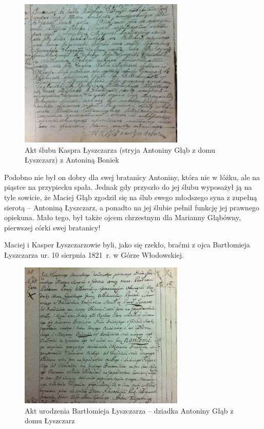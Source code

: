 \begin{figure}[!h]
\begin{center}
\includegraphics[width=0.7\textwidth]{zdjecia/akt_slubu_kaspra_lyszczarza_i_antoniny_boniek.jpg}
\caption{Akt ślubu Kaspra Łyszczarza (stryja Antoniny Głąb z domu Łyszczarz) z Antoniną Boniek}
\label{rys:akt_slubu_kaspra_lyszczarza_i_antoniny_boniek}
\end{center}
\end{figure}

Podobno nie był on dobry dla swej bratanicy Antoniny, która nie w łóżku, ale na piąstce na przypiecku spała. Jednak gdy przyszło do jej ślubu wyposażył ją na tyle sowicie, że Maciej Głąb zgodził się na ślub swego młodszego syna z zupełną sierotą -- Antoniną Łyszczarz, a ponadto na jej ślubie pełnił funkcję jej prawnego opiekuna. Mało tego, był także ojcem chrzestnym dla Marianny Głąbówny, pierwszej córki swej bratanicy!

Maciej i Kasper Łyszczarzowie byli, jako się rzekło, braćmi z ojca Bartłomieja Łyszczarza ur. 10 sierpnia 1821~r. w Górze Włodowskiej.


\begin{figure}[!h]
\begin{center}
\includegraphics[width=0.7\textwidth]{zdjecia/akt_urodzenia_bartlomieja_lyszczarza.jpg}
\caption[Akt urodzenia Bartłomieja Łyszczarza]{Akt urodzenia Bartłomieja Łyszczarza -- dziadka Antoniny Głąb z domu Łyszczarz}
\label{rys:akt_urodzenia_bartlomieja_lyszczarza}
\end{center}
\end{figure}

